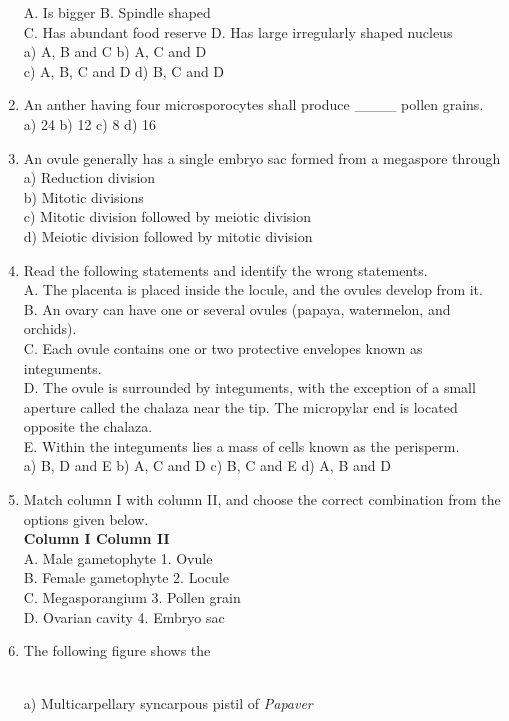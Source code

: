 \begin{enumerate}
  A. Is bigger B. Spindle shaped\\
  C. Has abundant food reserve D. Has large irregularly shaped nucleus\\
  a) A, B and C b) A, C and D\\
  c) A, B, C and D d) B, C and D
\item
  An anther having four microsporocytes shall produce \_\_\_\_ pollen
  grains.\\
  a) 24 b) 12 c) 8 d) 16
\item
  An ovule generally has a single embryo sac formed from a megaspore
  through\\
  a) Reduction division\\
  b) Mitotic divisions\\
  c) Mitotic division followed by meiotic division\\
  d) Meiotic division followed by mitotic division
\item
  Read the following statements and identify the wrong statements.\\
  A. The placenta is placed inside the locule, and the ovules develop
  from it.\\
  B. An ovary can have one or several ovules (papaya, watermelon, and
  orchids).\\
  C. Each ovule contains one or two protective envelopes known as
  integuments.\\
  D. The ovule is surrounded by integuments, with the exception of a
  small aperture called the chalaza near the tip. The micropylar end is
  located opposite the chalaza.\\
  E. Within the integuments lies a mass of cells known as the
  perisperm.\\
  a) B, D and E b) A, C and D c) B, C and E d) A, B and D
\item
  Match column I with column II, and choose the correct combination from
  the options given below.\\
  \textbf{Column I Column II\\
  }A. Male gametophyte 1. Ovule\\
  B. Female gametophyte 2. Locule\\
  C. Megasporangium 3. Pollen grain\\
  D. Ovarian cavity 4. Embryo sac
\item
  The following figure shows the\\
  \strut \\
  a) Multicarpellary syncarpous pistil of \emph{Papaver}\\

\end{enumerate}
